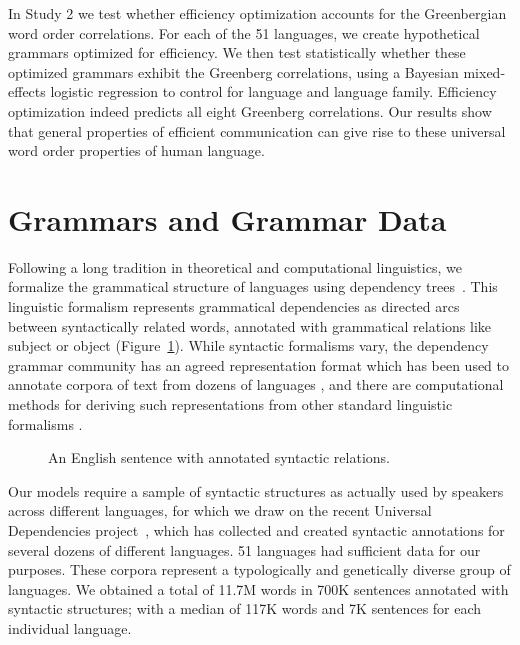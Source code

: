 \documentclass[9pt,twocolumn,twoside,lineno]{pnas-new}
\begin{document}
In Study 2 we test whether efficiency optimization accounts for the Greenbergian word order correlations.  For each of the 51 languages, we create hypothetical grammars optimized for efficiency.  We then test statistically whether these optimized grammars exhibit the Greenberg correlations, using a Bayesian mixed-effects logistic regression to control for language and language family.  Efficiency optimization indeed predicts all eight Greenberg correlations.
Our results show that general properties of efficient communication can give rise to these universal word order properties of human language.



\section*{Grammars and Grammar Data}

Following a long tradition in theoretical and computational linguistics, we formalize  the grammatical structure of languages using dependency trees~\cite{hays1964dependency,hudson1984word,melcuk1988dependency,corbett1993heads,tesniere2015elements}.
This linguistic formalism represents grammatical dependencies as directed arcs between syntactically related words, annotated with grammatical relations like subject or object (Figure~\ref{fig:sent-dep}).
While syntactic formalisms vary, the dependency grammar community has an agreed representation format  which has been used to  annotate corpora of text from dozens of languages \cite{ud2.1}, and there are 
computational methods for deriving such representations from other standard linguistic formalisms \cite{boston2009dependency}.

\begin{figure}[ht]
    \centering
{
}
	\caption{An English sentence with annotated syntactic relations.}
	\label{fig:sent-dep}
\end{figure}

Our models require a sample of syntactic structures as actually used by speakers across different languages, for which we draw on the recent
Universal Dependencies project~\cite{ud2.1}, which has collected and created syntactic annotations for several dozens of different languages.
51 languages had sufficient data for our purposes. 
These corpora represent a typologically and genetically diverse group of languages. %
We obtained a total of 11.7M words in 700K sentences annotated with syntactic structures; with a median of 117K words and 7K sentences for each individual language.
\end{document}
